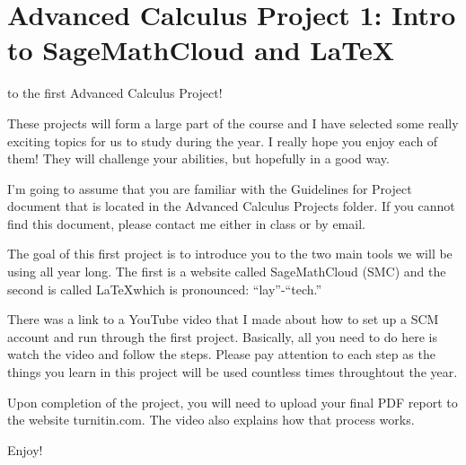 \documentclass
[justified,nohyper]
{tufte-handout}
\begin{document}
\begin{center}
\end{center}
\section{Advanced Calculus Project 1: Intro to SageMathCloud and \LaTeX}
 to the first Advanced Calculus Project!

These projects will form a large part of the course and I have selected some really exciting topics for us to study during the year. I really hope you enjoy each of them! They will challenge your abilities, but hopefully in a good way.

I'm going to assume that you are familiar with the Guidelines for Project document that is located in the Advanced Calculus Projects folder. If you cannot find this document, please contact me either in class or by email.

The goal of this first project is to introduce you to the two main tools we will be using all year long. The first is a website called SageMathCloud (SMC) and the second is called \LaTeX which is pronounced: ``lay''-``tech.''

There was a link to a YouTube video that I made about how to set up a SCM account and run through the first project. Basically, all you need to do here is watch the video and follow the steps. Please pay attention to each step as the things you learn in this project will be used countless times throughtout the year.

Upon completion of the project, you will need to upload your final PDF report to the website turnitin.com. The video also explains how that process works.

Enjoy! 
\end{document}
